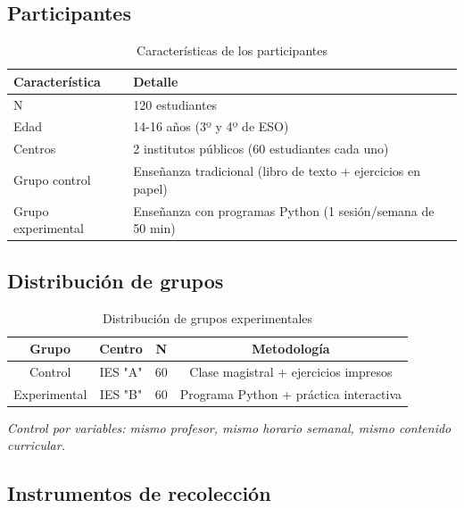 \documentclass[12pt,spanish]{article}
\begin{document}
\subsection{Participantes}

\begin{table}[H]
\centering
\caption{Características de los participantes}
\label{tab:participantes}
\begin{tabular}{|p{3.5cm}|p{8cm}|}
\hline
\textbf{Característica} & \textbf{Detalle} \\
\hline
N & 120 estudiantes \\
\hline
Edad & 14-16 años (3º y 4º de ESO) \\
\hline
Centros & 2 institutos públicos (60 estudiantes cada uno) \\
\hline
Grupo control & Enseñanza tradicional (libro de texto + ejercicios en papel) \\
\hline
Grupo experimental & Enseñanza con programas Python (1 sesión/semana de 50 min) \\
\hline
\end{tabular}
\end{table}

\subsection{Distribución de grupos}

\begin{table}[H]
\centering
\caption{Distribución de grupos experimentales}
\label{tab:grupos}
\begin{tabular}{|c|c|c|c|}
\hline
\textbf{Grupo} & \textbf{Centro} & \textbf{N} & \textbf{Metodología} \\
\hline
Control & IES "A" & 60 & Clase magistral + ejercicios impresos \\
\hline
Experimental & IES "B" & 60 & Programa Python + práctica interactiva \\
\hline
\end{tabular}
\end{table}

\textit{Control por variables: mismo profesor, mismo horario semanal, mismo contenido curricular.}

\subsection{Instrumentos de recolección}
\end{document}
